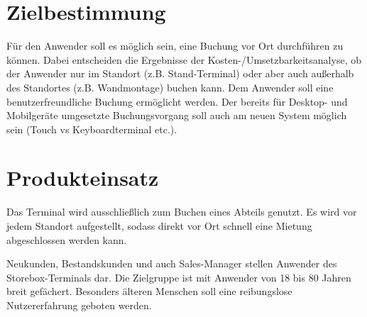 
\section{Zielbestimmung}
Für den Anwender soll es möglich sein, eine Buchung vor Ort durchführen zu können. Dabei entscheiden die Ergebnisse der Kosten-/Umsetzbarkeitsanalyse, ob der Anwender nur im Standort (z.B. Stand-Terminal) oder aber auch außerhalb des Standortes (z.B. Wandmontage) buchen kann. Dem Anwender soll eine benutzerfreundliche Buchung ermöglicht werden. Der bereits für Desktop- und Mobilgeräte umgesetzte Buchungsvorgang soll auch am neuen System möglich sein (Touch vs Keyboardterminal etc.). 

\section{Produkteinsatz}
Das Terminal wird ausschließlich zum Buchen eines Abteils genutzt. Es wird vor jedem Standort aufgestellt, sodass direkt vor Ort schnell eine Mietung abgeschlossen werden kann.

Neukunden, Bestandskunden und auch Sales-Manager stellen Anwender des Storebox-Terminals dar. Die Zielgruppe ist mit Anwender von 18 bis 80 Jahren breit gefächert. Besonders älteren Menschen soll eine reibungslose Nutzererfahrung geboten werden.